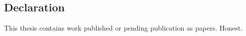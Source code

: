 
\chapter*{}

\section*{\center Declaration}

This thesis contains work published or pending publication as papers. Honest.
